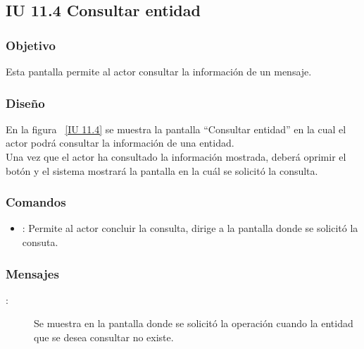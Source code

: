 \subsection{IU 11.4 Consultar entidad}

\subsubsection{Objetivo}
	
	Esta pantalla permite al actor consultar la información de un mensaje.
	
\subsubsection{Diseño}

    En la figura ~\ref{IU 11.4} se muestra la pantalla ``Consultar entidad'' en la cual el actor podrá consultar la información de una entidad.\\
	
	Una vez que el actor ha consultado la información mostrada, deberá oprimir el botón  y el sistema mostrará la pantalla en la cuál se solicitó la consulta.


\subsubsection{Comandos}
\begin{itemize}
	\item {}: Permite al actor concluir la consulta, dirige a la pantalla donde se solicitó la consuta.
\end{itemize}

\subsubsection{Mensajes}
	
\begin{description}
	\item[:] Se muestra en la pantalla donde se solicitó la operación cuando la entidad que se desea consultar no existe.
\end{description}
